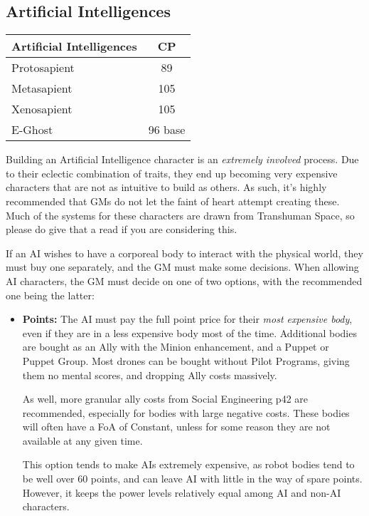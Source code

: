 \begin{multicols*}{3}
	\subsection{Artificial Intelligences}
	
	\begin{center}
		\begin{tabularx}{0.32\textwidth}{|X|c|}
			\hline
			Artificial Intelligences & CP \\
			\hline
			\hline
			Protosapient & 89\\
			Metasapient & 105\\
			Xenosapient & 105 \\
			E-Ghost & 96 base\\
			\hline
		\end{tabularx}
	\end{center}
	
	Building an Artificial Intelligence character is an \textit{extremely involved} process. Due to their eclectic combination of traits, they end up becoming very expensive characters that are not as intuitive to build as others. As such, it's highly recommended that GMs do not let the faint of heart attempt creating these. Much of the systems for these characters are drawn from \GURPS Transhuman Space, so please do give that a read if you are considering this.
	
	If an AI wishes to have a corporeal body to interact with the physical world, they must buy one separately, and the GM must make some decisions. When allowing AI characters, the GM must decide on one of two options, with the recommended one being the latter:
	\begin{itemize}
		\item \textbf{Points: } The AI must pay the full point price for their \textit{most expensive body}, even if they are in a less expensive body most of the time. Additional bodies are bought as an Ally with the Minion enhancement, and a Puppet or Puppet Group. Most drones can be bought without Pilot Programs, giving them no mental scores, and dropping Ally costs massively. 
		
		As well, more granular ally costs from Social Engineering p42 are recommended, especially for bodies with large negative costs. These bodies will often have a FoA of Constant, unless for some reason they are not available at any given time. 
		
		This option tends to make AIs extremely expensive, as robot bodies tend to be well over 60 points, and can leave AI with little in the way of spare points. However, it keeps the power levels relatively equal among AI and non-AI characters. 
		

\end{itemize}
\end{multicols*}
